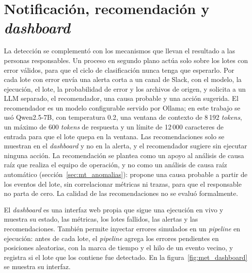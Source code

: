 \section{Notificación, recomendación y \textit{dashboard}}\label{sec:met_notificacion}\label{sec:met_dashboard}

La detección se complementó con los mecanismos que llevan el resultado a las personas responsables. Un proceso en segundo plano actúa solo sobre los lotes con error válidos, para que el ciclo de clasificación nunca tenga que esperarlo. Por cada lote con error envía una alerta corta a un canal de Slack, con el modelo, la ejecución, el lote, la probabilidad de error y los archivos de origen, y solicita a un LLM separado, el recomendador, una causa probable y una acción sugerida. El recomendador es un modelo configurable servido por Ollama; en este trabajo se usó Qwen2.5-7B, con temperatura 0.2, una ventana de contexto de 8\,192 \textit{tokens}, un máximo de 600 \textit{tokens} de respuesta y un límite de 12\,000 caracteres de entrada para que el lote quepa en la ventana. Las recomendaciones solo se muestran en el \textit{dashboard} y no en la alerta, y el recomendador sugiere sin ejecutar ninguna acción. La recomendación se plantea como un apoyo al análisis de causa raíz que realiza el equipo de operación, y no como un análisis de causa raíz automático (sección~\ref{sec:mt_anomalias}): propone una causa probable a partir de los eventos del lote, sin correlacionar métricas ni trazas, para que el responsable no parta de cero. La calidad de las recomendaciones no se evaluó formalmente.

El \textit{dashboard} es una interfaz web propia que sigue una ejecución en vivo y muestra su estado, las métricas, los lotes fallidos, las alertas y las recomendaciones. También permite inyectar errores simulados en un \textit{pipeline} en ejecución: antes de cada lote, el \textit{pipeline} agrega los errores pendientes en posiciones aleatorias, con la marca de tiempo y el hilo de un evento vecino, y registra si el lote que los contiene fue detectado. En la figura~\ref{fig:met_dashboard} se muestra su interfaz.


